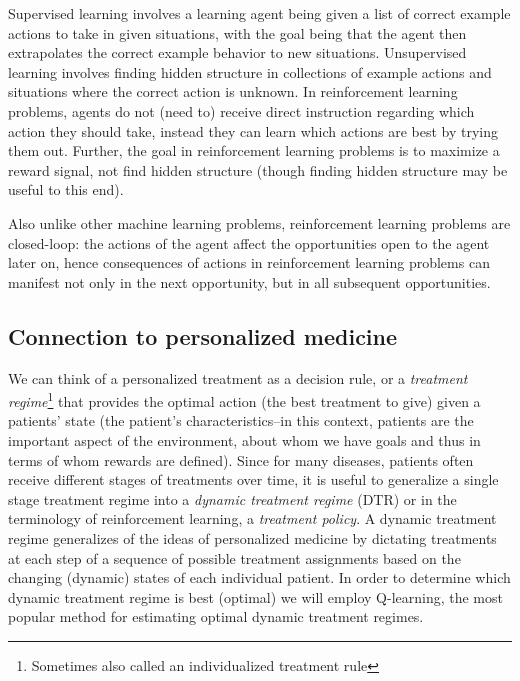 \documentclass[12pt]{article}
\begin{document}
Supervised learning involves a learning agent being given a list of  correct example actions to take in given situations, with the goal being that the agent then extrapolates the correct example behavior to new situations. Unsupervised learning involves finding hidden structure in collections of example actions and situations where the correct action is unknown. In reinforcement learning problems, agents do not (need to) receive direct instruction regarding which action they should take, instead they can learn which actions are best by trying them out. Further, the goal in reinforcement learning problems is to maximize a reward signal, not find hidden structure (though finding hidden structure may be useful to this end).

Also unlike other machine learning problems, reinforcement learning problems are closed-loop: the actions of the agent affect the opportunities open to the agent later on, hence consequences of actions in reinforcement learning problems can manifest not only in the next opportunity, but in all subsequent opportunities.


\subsection{Connection to personalized medicine} %
\label{sub:dynamic_treatment_regimes}

We can think of a personalized treatment as a decision rule, or a \emph{treatment regime}\footnote{Sometimes also called an individualized treatment rule} that provides the optimal action (the best treatment to give) given a patients' state (the patient's characteristics--in this context, patients are the important aspect of the environment, about whom we have goals and thus in terms of whom rewards are defined). Since for many diseases, patients often receive different stages of treatments over time, it is useful to generalize a single stage treatment regime into a \emph{dynamic treatment regime} (DTR) or in the terminology of reinforcement learning, a \emph{treatment policy}. A dynamic treatment regime generalizes of the ideas of personalized medicine by dictating treatments at each step of a sequence of possible treatment assignments based on the changing (dynamic) states of each individual patient. In order to determine which dynamic treatment regime is best (optimal) we will employ Q-learning, the most popular method for estimating optimal dynamic treatment regimes.
\end{document}
